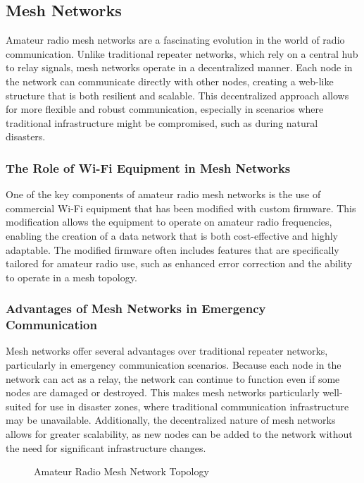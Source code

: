\subsection{Mesh Networks}
\label{subsec:mesh}

Amateur radio mesh networks are a fascinating evolution in the world of radio communication. Unlike traditional repeater networks, which rely on a central hub to relay signals, mesh networks operate in a decentralized manner. Each node in the network can communicate directly with other nodes, creating a web-like structure that is both resilient and scalable. This decentralized approach allows for more flexible and robust communication, especially in scenarios where traditional infrastructure might be compromised, such as during natural disasters.

\subsubsection*{The Role of Wi-Fi Equipment in Mesh Networks}

One of the key components of amateur radio mesh networks is the use of commercial Wi-Fi equipment that has been modified with custom firmware. This modification allows the equipment to operate on amateur radio frequencies, enabling the creation of a data network that is both cost-effective and highly adaptable. The modified firmware often includes features that are specifically tailored for amateur radio use, such as enhanced error correction and the ability to operate in a mesh topology.

\subsubsection*{Advantages of Mesh Networks in Emergency Communication}

Mesh networks offer several advantages over traditional repeater networks, particularly in emergency communication scenarios. Because each node in the network can act as a relay, the network can continue to function even if some nodes are damaged or destroyed. This makes mesh networks particularly well-suited for use in disaster zones, where traditional communication infrastructure may be unavailable. Additionally, the decentralized nature of mesh networks allows for greater scalability, as new nodes can be added to the network without the need for significant infrastructure changes.

\begin{figure}[h]
    \centering
    \caption{Amateur Radio Mesh Network Topology}
    \label{fig:mesh-topology}
\end{figure}

